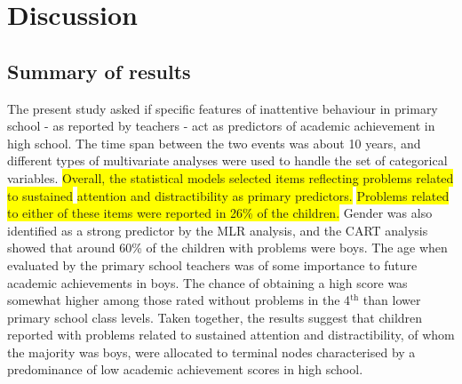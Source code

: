 \documentclass[10pt,letterpaper]{article}
\begin{document}
{%
%

\section*{Discussion}
\subsection*{Summary of results}
The present study asked if specific features of inattentive behaviour in primary school - as reported by teachers - act as predictors of academic achievement in high school. The time span between the two events was about 10 years, and different types of multivariate analyses were used to handle the set of categorical variables.  \colorbox{yellow}{Overall, the statistical models selected items reflecting problems related to sustained}  \colorbox{yellow}{attention and distractibility as primary predictors.}  \colorbox{yellow}{Problems related to either of these items were reported in 26\% of the children.} Gender was also identified as a strong predictor by the MLR analysis, and the CART analysis showed that around 60\% of the children with problems were boys. The age when evaluated by the primary school teachers was of some importance to future academic achievements in boys. The chance of obtaining a high score was somewhat higher among those rated without problems in the 4$^{\text{th}}$ than lower primary school class levels. Taken together, the results suggest that children reported with problems related to sustained attention and distractibility, of whom the majority was boys, were allocated to terminal nodes characterised by a predominance of low academic achievement scores in high school. \\

}
\end{document}
